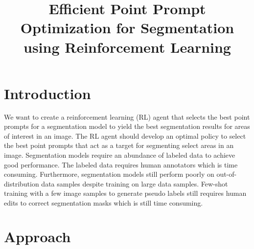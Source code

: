 \documentclass[conference]{IEEEtran}
\begin{document}
\title{Efficient Point Prompt Optimization for Segmentation using Reinforcement Learning}

\author{
}

\maketitle

\section{Introduction}

We want to create a reinforcement learning (RL) agent that selects the best point prompts for a segmentation model to yield the best segmentation results for areas of interest in an image. The RL agent should develop an optimal policy to select the best point prompts that act as a target for segmenting select areas in an image. Segmentation models require an abundance of labeled data to achieve good performance. The labeled data requires human annotators which is time consuming. Furthermore, segmentation models still perform poorly on out-of-distribution data samples despite training on large data samples. Few-shot training with a few image samples to generate pseudo labels still requires human edits to correct segmentation masks which is still time consuming.

\section{Approach}
\end{document}
